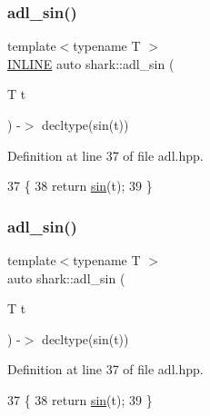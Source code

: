 \subsubsection{\texorpdfstring{adl\+\_\+sin()}{adl\_sin()}\hspace{0.1cm}{\footnotesize\ttfamily [1/2]}}
{\footnotesize\ttfamily template$<$typename T $>$ \\
\hyperlink{common_8hpp_a2eb6f9e0395b47b8d5e3eeae4fe0c116}{I\+N\+L\+I\+NE} auto shark\+::adl\+\_\+sin (\begin{DoxyParamCaption}\item[{T}]{t }\end{DoxyParamCaption}) -\/$>$  decltype(sin(t))\hspace{0.3cm}{\ttfamily [inline]}}



Definition at line 37 of file adl.\+hpp.


\begin{DoxyCode}
37                                                  \{
38         \textcolor{keywordflow}{return} \hyperlink{namespaceshark_1_1ndim_ad0b8060a85f85b70899c28e4fb9e7047}{sin}(t);
39     \}
\end{DoxyCode}
\hypertarget{namespaceshark_ada90d7cb1a90a692b2c9a2f3cb6cfa5f}{}\label{namespaceshark_ada90d7cb1a90a692b2c9a2f3cb6cfa5f} 
\subsubsection{\texorpdfstring{adl\+\_\+sin()}{adl\_sin()}\hspace{0.1cm}{\footnotesize\ttfamily [2/2]}}
{\footnotesize\ttfamily template$<$typename T $>$ \\
auto shark\+::adl\+\_\+sin (\begin{DoxyParamCaption}\item[{T}]{t }\end{DoxyParamCaption}) -\/$>$ decltype(sin(t)) \hspace{0.3cm}{\ttfamily [inline]}}



Definition at line 37 of file adl.\+hpp.


\begin{DoxyCode}
37                                                  \{
38         \textcolor{keywordflow}{return} \hyperlink{namespaceshark_1_1ndim_ad0b8060a85f85b70899c28e4fb9e7047}{sin}(t);
39     \}
\end{DoxyCode}
\hypertarget{namespaceshark_a3d59270cba11d6b4a4b75c37064cfaf3}{}\label{namespaceshark_a3d59270cba11d6b4a4b75c37064cfaf3} 
